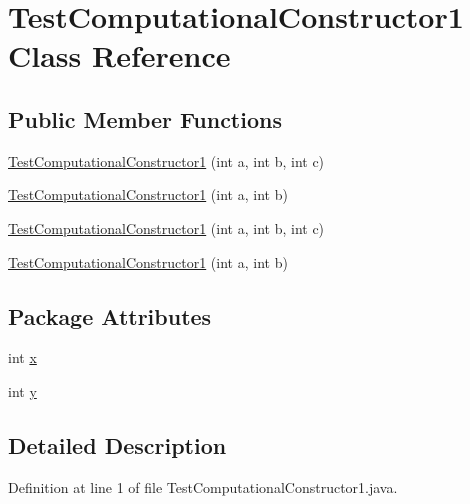 \hypertarget{classTestComputationalConstructor1}{
\section{TestComputationalConstructor1 Class Reference}
\label{classTestComputationalConstructor1}
}
\subsection*{Public Member Functions}
\begin{DoxyCompactItemize}
\item 
\hyperlink{classTestComputationalConstructor1_a39f9fcc5b63c29ac52edc07d32736017}{TestComputationalConstructor1} (int a, int b, int c)
\item 
\hyperlink{classTestComputationalConstructor1_af571316873e09cd6e6c1edbb9a1518a3}{TestComputationalConstructor1} (int a, int b)
\item 
\hyperlink{classTestComputationalConstructor1_a39f9fcc5b63c29ac52edc07d32736017}{TestComputationalConstructor1} (int a, int b, int c)
\item 
\hyperlink{classTestComputationalConstructor1_af571316873e09cd6e6c1edbb9a1518a3}{TestComputationalConstructor1} (int a, int b)
\end{DoxyCompactItemize}
\subsection*{Package Attributes}
\begin{DoxyCompactItemize}
\item 
int \hyperlink{classTestComputationalConstructor1_a698634df0e42454ff7920579b8711a31}{x}
\item 
int \hyperlink{classTestComputationalConstructor1_a3ee7eb42c5bcb713e70e98c2fff0c44d}{y}
\end{DoxyCompactItemize}


\subsection{Detailed Description}


Definition at line 1 of file TestComputationalConstructor1.java.



